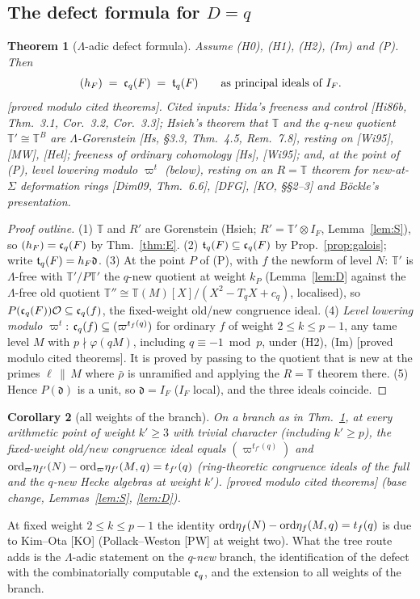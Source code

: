 \documentclass[11pt]{amsart}
\theoremstyle{plain}
\newtheorem{theorem}{Theorem}[section]
\newtheorem{corollary}[theorem]{Corollary}
\theoremstyle{definition}
\theoremstyle{remark}
\newcommand{\status}[1]{\textup{\textsf{[#1]}}}
\newcommand{\stpmc}{\status{proved modulo cited theorems}}
\newcommand{\T}{\mathbb{T}}\newcommand{\m}{\mathfrak{m}}\newcommand{\cT}{\mathcal{T}}\newcommand{\cX}{\mathcal{X}}
\begin{document}
\subsection{The defect formula for $D=q$}
\begin{theorem}[$\Lambda$-adic defect formula]\label{thm:defect}
Assume (H0), (H1), (H2), (Im) and (P). Then
\[(h_F)\;=\;\mathfrak{c}_q(F)\;=\;\mathfrak{t}_q(F)\qquad\text{as principal ideals of }I_F.\]
\stpmc. Cited inputs: Hida's freeness and control [Hi86b, Thm.~3.1, Cor.~3.2, Cor.~3.3]; Hsieh's theorem that $\T$ and the $q$-new quotient $\T'\cong\T^{B}$ are $\Lambda$-Gorenstein [Hs, \S3.3, Thm.~4.5, Rem.~7.8], resting on [Wi95], [MW], [Hel]; freeness of ordinary cohomology [Hs], [Wi95]; and, at the point of (P), level lowering modulo $\varpi^t$ (below), resting on an $R=\T$ theorem for new-at-$\Sigma$ deformation rings [Dim09, Thm.~6.6], [DFG], [KO, \S\S2--3] and Böckle's presentation.
\end{theorem}
\begin{proof}[Proof outline]
(1) $\T$ and $R'$ are Gorenstein (Hsieh; $R'=\T'\otimes I_F$, Lemma~\ref{lem:S}), so $(h_F)=\mathfrak{c}_q(F)$ by Thm.~\ref{thm:E}.
(2) $\mathfrak{t}_q(F)\subseteq\mathfrak{c}_q(F)$ by Prop.~\ref{prop:galois}; write $\mathfrak{t}_q(F)=h_F\mathfrak d$.
(3) At the point $P$ of (P), with $f$ the newform of level $N$: $\T'$ is $\Lambda$-free with $\T'/P\T'$ the $q$-new quotient at weight $k_P$ (Lemma~\ref{lem:D} against the $\Lambda$-free old quotient $\T''\cong\T(M)[X]/(X^2-T_qX+c_q)$, localised), so $P(\mathfrak{c}_q(F))\mathcal{O}\subseteq\mathfrak{c}_q(f)$, the fixed-weight old/new congruence ideal.
(4) \emph{Level lowering modulo $\varpi^t$}: $\mathfrak{c}_q(f)\subseteq(\varpi^{t_f(q)})$ for ordinary $f$ of weight $2\le k\le p-1$, any tame level $M$ with $p\nmid\varphi(qM)$, including $q\equiv-1\bmod p$, under (H2), (Im) \stpmc. It is proved by passing to the quotient that is new at the primes $\ell\,\|\,M$ where $\bar\rho$ is unramified and applying the $R=\T$ theorem there.
(5) Hence $P(\mathfrak d)$ is a unit, so $\mathfrak d=I_F$ ($I_F$ local), and the three ideals coincide.
\end{proof}

\begin{corollary}[all weights of the branch]\label{cor:allweights}
On a branch as in Thm.~\ref{thm:defect}, at every arithmetic point of weight $k'\ge3$ with trivial character (including $k'\ge p$), the fixed-weight old/new congruence ideal equals $(\varpi^{t_{f'}(q)})$ and $\mathrm{ord}_\varpi\eta_{f'}(N)-\mathrm{ord}_\varpi\eta_{f'}(M,q)=t_{f'}(q)$ (ring-theoretic congruence ideals of the full and the $q$-new Hecke algebras at weight $k'$). \stpmc{} (base change, Lemmas~\ref{lem:S}, \ref{lem:D}).
\end{corollary}
At fixed weight $2\le k\le p-1$ the identity $\mathrm{ord}\eta_f(N)-\mathrm{ord}\eta_f(M,q)=t_f(q)$ is due to Kim--Ota [KO] (Pollack--Weston [PW] at weight two). What the tree route adds is the $\Lambda$-adic statement on the $q$-\emph{new} branch, the identification of the defect with the combinatorially computable $\mathfrak{c}_q$, and the extension to all weights of the branch.
\end{document}
